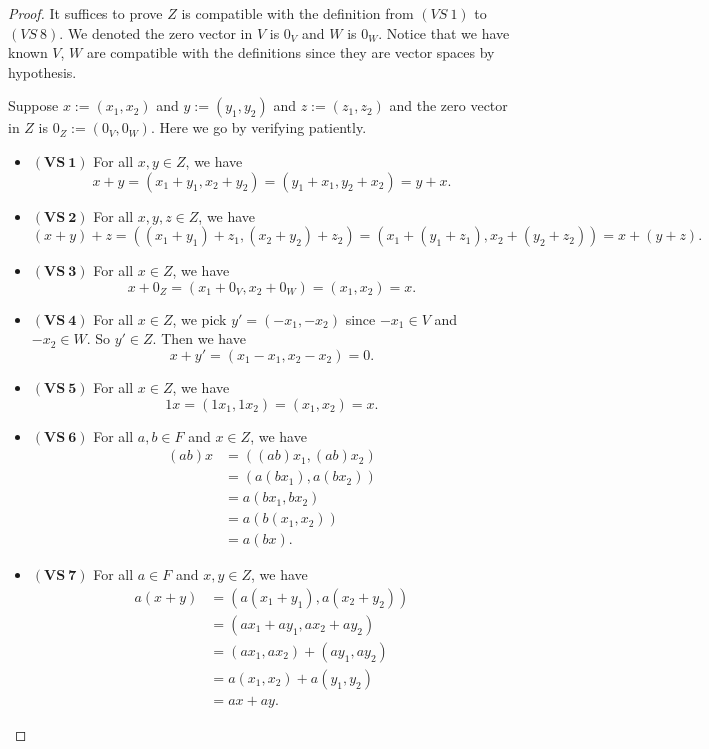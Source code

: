 \begin{Exercise}
\begin{proof}
It suffices to prove $Z$ is compatible with the definition from $(VS\ 1)$ to $(VS\ 8)$. We denoted the zero vector in  $V$ is $0_V$ and $W$ is $0_W$. Notice that we have known $V$, $W$ are compatible with the definitions since they are vector spaces by hypothesis.

Suppose $x := (x_1,x_2)$ and $y := (y_1,y_2)$ and $z := (z_1,z_2)$ and the zero vector in $Z$ is $0_Z := (0_V,0_W)$. Here we go by verifying patiently.
\begin{itemize}
\item $\mathbf{(VS\ 1)}$
For all $x,y \in Z$, we have
$$
x+y
= (x_1+y_1,x_2+y_2)
= (y_1+x_1,y_2+x_2)
= y+x.
$$

\item $\mathbf{(VS\ 2)}$
For all $x,y,z\in Z$, we have
$$
(x+y)+z
= ( (x_1+y_1)+z_1, (x_2+y_2)+z_2 )
= ( x_1+(y_1+z_1), x_2+(y_2+z_2) )
= x+(y+z).
$$

\item $\mathbf{(VS\ 3)}$
For all $x\in Z$, we have
$$
x+0_Z
= (x_1 + 0_V, x_2+0_W)
= (x_1,x_2)
= x.
$$

\item $\mathbf{(VS\ 4)}$
For all $x\in Z$, we pick $y' = (-x_1, -x_2)$ since $-x_1\in V$ and $-x_2\in W$. So $y'\in Z$. Then we have
$$
x+y'
= (x_1-x_1, x_2-x_2)
= 0.
$$

\item $\mathbf{(VS\ 5)}$
For all $x\in Z$, we have
$$
1x
= (1 x_1,1 x_2)
= (x_1, x_2)
= x.
$$

\item $\mathbf{(VS\ 6)}$
For all $a,b\in F$ and $x\in Z$, we have
\begin{align*}
(ab)x
&= ( (ab) x_1, (ab) x_2) \\
&= (a (b x_1), a (b x_2)) \\
&= a (b x_1, b x_2) \\
&= a (b (x_1, x_2) ) \\
&= a(bx).
\end{align*}

\item $\mathbf{(VS\ 7)}$
For all $a\in F$ and $x,y\in Z$, we have
\begin{align*}
a(x+y)
&= (a(x_1+y_1), a(x_2+y_2)) \\
&= (a x_1 + a y_1, a x_2 + a y_2) \\
&= (a x_1, a x_2) + (a y_1, a y_2) \\
&= a(x_1, x_2) + a(y_1,y_2) \\
&= a x+a y.
\end{align*}


\end{itemize}
\end{proof}
\end{Exercise}
